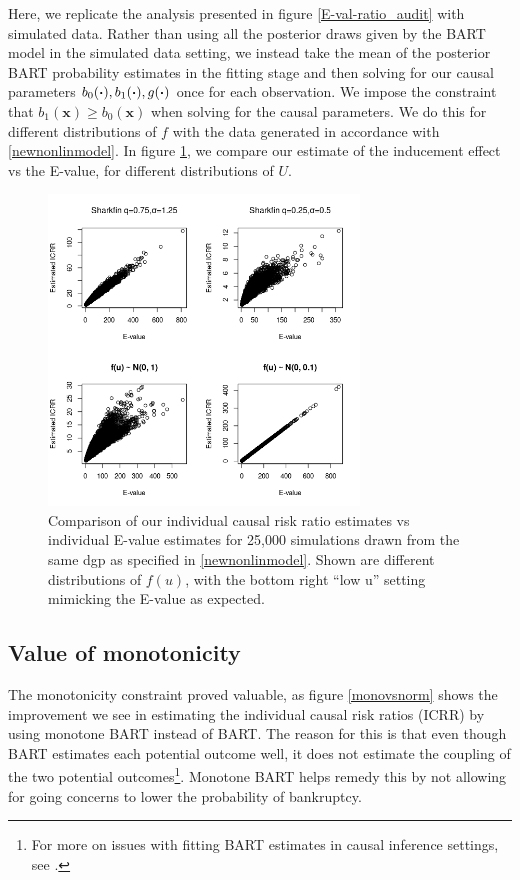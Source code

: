 \documentclass[aoas,preprint, 11pt, dvipsnames, table, x11name]{imsart}
\renewcommand{\bm}[1]{\mathbf{#1}}
\theoremstyle{remark}
\begin{document}
	Here, we replicate the analysis presented in figure \ref{E-val-ratio_audit} with simulated data.  Rather than using all the posterior draws given by the BART model in the simulated data setting, we instead take the mean of the posterior BART probability estimates in the fitting stage and then solving for our causal parameters $b_0(\vdot), b_1(\vdot), g(\vdot)$ once for each observation.  We impose the constraint that $b_1(\bm{x})\geq b_0(\bm{x})$ when solving for the causal parameters. We do this for different distributions of $f$ with the data generated in accordance with \ref{newnonlinmodel}.   In figure \ref{E-val-ratio}, we compare our estimate of the inducement effect vs the E-value, for different distributions of $U$.  
\begin{figure}[h]
	\centering

	\includegraphics[height=8.25cm]{eval_vs_our_sim}

	\caption[E-val vs ratio]{  Comparison of our individual causal risk ratio estimates vs individual E-value estimates for 25,000 simulations drawn from the same dgp as specified in \ref{newnonlinmodel}.  Shown are different distributions of $f(u)$, with the bottom right ``low u'' setting mimicking the E-value as expected. }
	\label{E-val-ratio}
	
\end{figure}

\subsection{Value of monotonicity}\label{mono_section}
The monotonicity constraint proved valuable, as figure \ref{monovsnorm} shows the improvement we see in estimating the individual causal risk ratios (ICRR) by using monotone BART instead of BART.  The reason for this is that even though BART estimates each potential outcome well, it does not estimate the coupling of the two potential outcomes\footnote{For more on issues with fitting BART estimates in causal inference settings, see \cite{bcf}.}.  Monotone BART helps remedy this by not allowing for going concerns to lower the probability of bankruptcy.  
\end{document}
